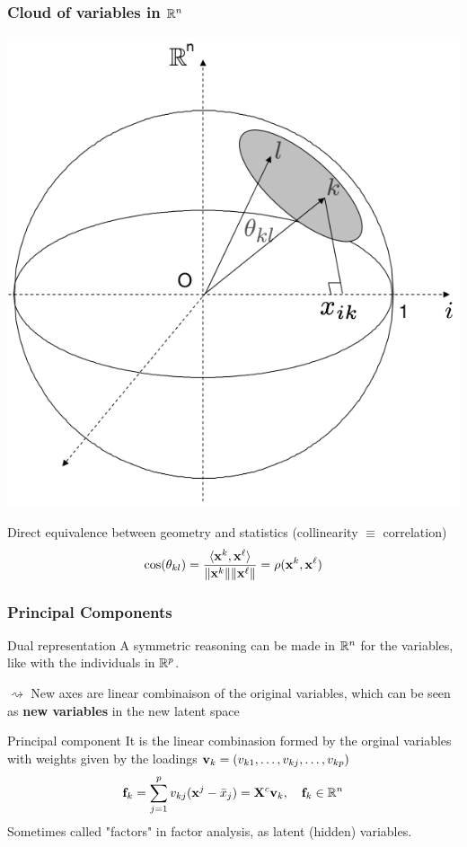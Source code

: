 \documentclass{beamer}\usepackage[]{graphicx}\usepackage[]{color}
\begin{document}
\begin{frame}
  \frametitle{Cloud of variables in $\mathbb{R}^n$}
  
  \begin{center}
    \includegraphics[width=.45\textwidth]{nuage_var}
  \end{center}

  Direct equivalence between geometry and statistics (collinearity $\equiv$ correlation) 
  \begin{equation*}
    \cos(\theta_{kl}) = \frac{\langle \mathbf{x}^k ,\mathbf{x}^\ell \rangle}{\|\mathbf{x}^k\| \|\mathbf{x}^\ell\|} = \rho(\mathbf{x}^k,\mathbf{x}^\ell)
  \end{equation*}

\end{frame}

\begin{frame}
  \frametitle{Principal Components}
  
  \begin{block}{Dual representation}
    A symmetric reasoning can be made in $\mathbb{R}^n$ for the variables, like with the individuals in $\mathbb{R}^p$.
    
    $\rightsquigarrow$ New axes are linear combinaison of the original variables, which can be seen as \alert{\bf new variables} in the new latent space
  \end{block}

  \begin{block}{Principal component}
    It is the linear combinasion formed by the orginal variables with weights given by the loadings $\mathbf{v}_k = (v_{k1}, \dots, v_{kj}, \dots, v_{kp})$
    \begin{equation*}
      \mathbf{f}_{k}  = \sum_{j=1}^p v_{kj} (\mathbf{x}^{j} - \bar{x}_j) = \mathbf{X}^c \mathbf{v}_k, \quad \mathbf{f}_k \in \mathbb{R}^n
    \end{equation*}
    Sometimes called \alert{"factors"} in  factor analysis, as \alert{latent (hidden) variables}. 
  \end{block}

\end{frame}
\end{document}
